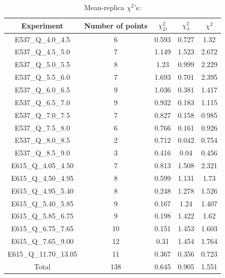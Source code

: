 \documentclass[]{article}
\begin{document}
\begin{table}[h]

\centering

\begin{tabular}{|c|c|c|c|c|} \hline

\textbf{Experiment} & \textbf{Number of
points} & \textbf{\(\chi_{D}^2\)} & \textbf{\(\chi_{\lambda}^2\)} & \textbf{\(\chi^2\)} \\ \hline

E537\_Q\_4.0\_4.5 & 6 & 0.593 & 0.727 & 1.32 \\ \hline
E537\_Q\_4.5\_5.0 & 7 & 1.149 & 1.523 & 2.672 \\ \hline
E537\_Q\_5.0\_5.5 & 8 & 1.23 & 0.999 & 2.229 \\ \hline
E537\_Q\_5.5\_6.0 & 7 & 1.693 & 0.701 & 2.395 \\ \hline
E537\_Q\_6.0\_6.5 & 9 & 1.036 & 0.381 & 1.417 \\ \hline
E537\_Q\_6.5\_7.0 & 9 & 0.932 & 0.183 & 1.115 \\ \hline
E537\_Q\_7.0\_7.5 & 7 & 0.827 & 0.158 & 0.985 \\ \hline
E537\_Q\_7.5\_8.0 & 6 & 0.766 & 0.161 & 0.926 \\ \hline
E537\_Q\_8.0\_8.5 & 2 & 0.712 & 0.042 & 0.754 \\ \hline
E537\_Q\_8.5\_9.0 & 3 & 0.416 & 0.04 & 0.456 \\ \hline
E615\_Q\_4.05\_4.50 & 7 & 0.813 & 1.508 & 2.321 \\ \hline
E615\_Q\_4.50\_4.95 & 8 & 0.599 & 1.131 & 1.73 \\ \hline
E615\_Q\_4.95\_5.40 & 8 & 0.248 & 1.278 & 1.526 \\ \hline
E615\_Q\_5.40\_5.85 & 9 & 0.167 & 1.24 & 1.407 \\ \hline
E615\_Q\_5.85\_6.75 & 9 & 0.198 & 1.422 & 1.62 \\ \hline
E615\_Q\_6.75\_7.65 & 10 & 0.151 & 1.453 & 1.603 \\ \hline
E615\_Q\_7.65\_9.00 & 12 & 0.31 & 1.454 & 1.764 \\ \hline
E615\_Q\_11.70\_13.05 & 11 & 0.367 & 0.356 & 0.723 \\ \hline
Total & 138 & 0.645 & 0.905 & 1.551 \\ \hline

\end{tabular}

\caption{Mean-replica \(\chi^2\)'s:}

\end{table}
\end{document}
